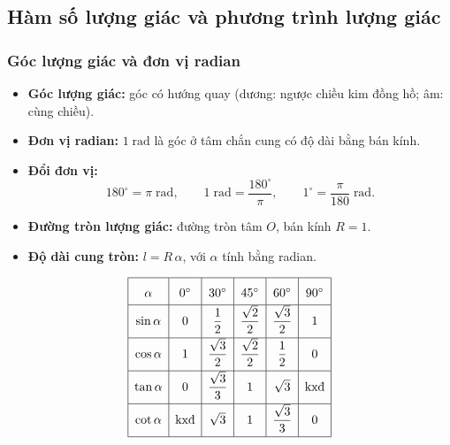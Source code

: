 \documentclass[12pt,a4paper]{article}
\begin{document}
\subsection{Hàm số lượng giác và phương trình lượng giác}

\subsubsection{Góc lượng giác và đơn vị radian}

\begin{dinhnghia}
  \begin{itemize}
    \item \textbf{Góc lượng giác:} góc có hướng quay (dương: ngược chiều kim đồng hồ; âm: cùng chiều).
    \item \textbf{Đơn vị radian:} $1\;\text{rad}$ là góc ở tâm chắn cung có độ dài bằng bán kính.
    \item \textbf{Đổi đơn vị:}
      \[
        180^\circ = \pi\;\text{rad},\qquad
        1\;\text{rad} = \dfrac{180^\circ}{\pi},\qquad
        1^\circ = \dfrac{\pi}{180}\;\text{rad}.
      \]
    \item \textbf{Đường tròn lượng giác:} đường tròn tâm $O$, bán kính $R = 1$.
    \item \textbf{Độ dài cung tròn:} $l = R\,\alpha$, với $\alpha$ tính bằng radian.
  \end{itemize}
\end{dinhnghia}

\begin{congthuc}[title={Bảng giá trị lượng giác đặc biệt}]
  \[
    \renewcommand{\arraystretch}{1.8}
    \begin{array}{|c|c|c|c|c|c|}
      \hline
      \alpha & 0^\circ & 30^\circ & 45^\circ & 60^\circ & 90^\circ \\
      \hline
      \sin\alpha & 0 & \dfrac{1}{2} & \dfrac{\sqrt{2}}{2} & \dfrac{\sqrt{3}}{2} & 1 \\[4pt]
      \hline
      \cos\alpha & 1 & \dfrac{\sqrt{3}}{2} & \dfrac{\sqrt{2}}{2} & \dfrac{1}{2} & 0 \\[4pt]
      \hline
      \tan\alpha & 0 & \dfrac{\sqrt{3}}{3} & 1 & \sqrt{3} & \text{kxđ} \\[4pt]
      \hline
      \cot\alpha & \text{kxđ} & \sqrt{3} & 1 & \dfrac{\sqrt{3}}{3} & 0 \\[4pt]
      \hline
    \end{array}
  \]
\end{congthuc}
\end{document}

